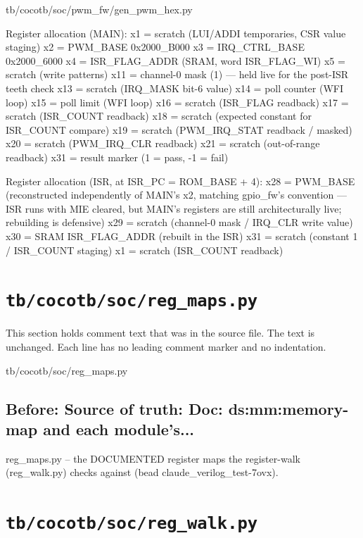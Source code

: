 \begin{relocated}{tb/cocotb/soc/pwm_fw/gen_pwm_hex.py}
\begin{textblock}
Register allocation (MAIN):
x1  = scratch (LUI/ADDI temporaries, CSR value staging)
x2  = PWM_BASE         0x2000_B000
x3  = IRQ_CTRL_BASE    0x2000_6000
x4  = ISR_FLAG_ADDR    (SRAM, word ISR_FLAG_WI)
x5  = scratch (write patterns)
x11 = channel-0 mask (1) — held live for the post-ISR teeth check
x13 = scratch (IRQ_MASK bit-6 value)
x14 = poll counter (WFI loop)
x15 = poll limit (WFI loop)
x16 = scratch (ISR_FLAG readback)
x17 = scratch (ISR_COUNT readback)
x18 = scratch (expected constant for ISR_COUNT compare)
x19 = scratch (PWM_IRQ_STAT readback / masked)
x20 = scratch (PWM_IRQ_CLR readback)
x21 = scratch (out-of-range readback)
x31 = result marker (1 = pass, -1 = fail)

Register allocation (ISR, at ISR_PC = ROM_BASE + 4):
x28 = PWM_BASE (reconstructed independently of MAIN's x2, matching gpio_fw's
convention — ISR runs with MIE cleared, but MAIN's registers are still
architecturally live; rebuilding is defensive)
x29 = scratch (channel-0 mask / IRQ_CLR write value)
x30 = SRAM ISR_FLAG_ADDR (rebuilt in the ISR)
x31 = scratch (constant 1 / ISR_COUNT staging)
x1  = scratch (ISR_COUNT readback)
\end{textblock}

\end{relocated}

\section{\texttt{tb/cocotb/soc/reg\_maps.py}}\label{tm:suite:soc-reg-maps}

This section holds comment text that was in the source file. The text is unchanged. Each line has no leading comment marker and no indentation.

\begin{relocated}{tb/cocotb/soc/reg_maps.py}

\subsection*{Before: Source of truth: Doc: ds:mm:memory-map and each module's...}

\begin{textblock}
reg_maps.py -- the DOCUMENTED register maps the register-walk (reg_walk.py) checks against
(bead claude_verilog_test-7ovx).
\end{textblock}

\end{relocated}

\section{\texttt{tb/cocotb/soc/reg\_walk.py}}\label{tm:suite:soc-reg-walk}

